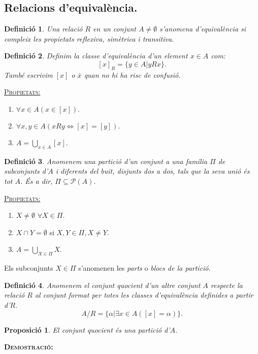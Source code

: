 \documentclass[11pt]{article}
\newcommand{\propietats}{\underline{{\scshape Propietats:}}}
\newtheorem{defi}{Definició}[section]
\newtheorem{prop}{Proposició}[section]
\newcommand{\demostracio}{\textbf{{\scshape Demostració:}}\\}
\begin{document}
\subsection{Relacions d'equivalència.}
\begin{defi} Una relació $R$ en un conjunt $A\neq\emptyset$ s'anomena \textit{d'equivalència} si compleix les propietats reflexiva, simètrica i transitiva.\end{defi}
\begin{defi} Definim la \textit{classe d'equivalència} d'un element $x\in A$ com:
$$[x]_R=\{y\in A|yRx\}.$$
També escrivim $[x]$ o $\bar{x}$ quan no hi ha risc de confusió.\end{defi}
\propietats \begin{enumerate}
	\item $\forall x\in A(x\in [x]).$
	\item $\forall x,y\in A (xRy\iff [x]=[y]).$
	\item $A=\bigcup_{x\in A}[x].$
\end{enumerate}
\begin{defi} Anomenem una \textit{partició d'un conjunt} a una família $\Pi$ de subconjunts d'$A$ i diferents del buit, disjunts dos a dos, tals que la seva unió és tot $A$. És a dir, $\Pi\subseteq\mathcal{P}(A)$.\end{defi}
\propietats
\begin{enumerate}
	\item $X\neq\emptyset$ $\forall X\in\Pi.$
	\item $X\cap Y = \emptyset$ si $X,Y\in\Pi,X\neq Y.$
	\item $A=\bigcup_{X\in\Pi}X.$
\end{enumerate}
Els subconjunts $X\in\Pi$ s'anomenen les \textit{parts} o \textit{blocs de la partició}.\\
\begin{defi} Anomenem el \textit{conjunt quocient} d'un altre conjunt $A$ respecte la relació $R$ al conjunt format per totes les classes d'equivalència definides a partir d'$R$.$$A/R=\{\alpha|\exists x\in A([x]=\alpha)\}.$$\end{defi}
\begin{prop} El conjunt quocient és una partició d'$A$.\end{prop}
\noindent\demostracio 
\end{document}
